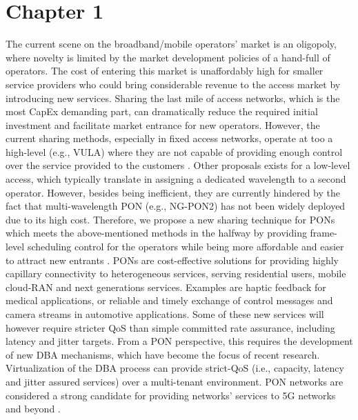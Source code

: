 \chapter*{Chapter 1}

The current scene on the broadband/mobile operators' market is an oligopoly, where novelty is limited by the market development policies of a hand-full of operators. The cost of entering this market is unaffordably high for smaller service providers who could bring considerable revenue to the access market by introducing new services. Sharing the last mile of access networks, which is the most \ac{CapEx} demanding part, can dramatically reduce the required initial investment and facilitate market entrance for new operators. However, the current sharing methods, especially in fixed access networks, operate at too a high-level (e.g., \ac{VULA}) where they are not capable of providing enough control over the service provided to the customers \cite{7592399}. Other proposals exists for a low-level access, which typically translate in assigning a dedicated wavelength to a second operator. However, besides being inefficient, they are currently hindered by the fact that multi-wavelength \ac{PON} (e.g., \ac{NG-PON2}) has not been widely deployed due to its high cost. Therefore, we propose a new sharing technique for \acp{PON} which meets the above-mentioned methods in the halfway by providing frame-level scheduling control for the operators while being more affordable and easier to attract new entrants \cite{7936877}.
 \acp{PON} are cost-effective solutions for providing highly capillary connectivity to heterogeneous services, serving residential users, mobile cloud-RAN and next generations services. Examples are haptic feedback for medical applications, or reliable and timely exchange of control messages and camera streams in automotive applications. Some of these new services will however require stricter \ac{QoS} than simple committed rate assurance, including latency and jitter targets. From a \ac{PON} perspective, this requires the development of new \ac{DBA} mechanisms, which have become the focus of recent research. Virtualization of the \ac{DBA} process can provide strict-\ac{QoS} (i.e., capacity, latency and jitter assured services) over a multi-tenant environment. \ac{PON} networks are considered a strong candidate for providing networks' services to 5G networks and beyond \cite{8412589}. 
 

